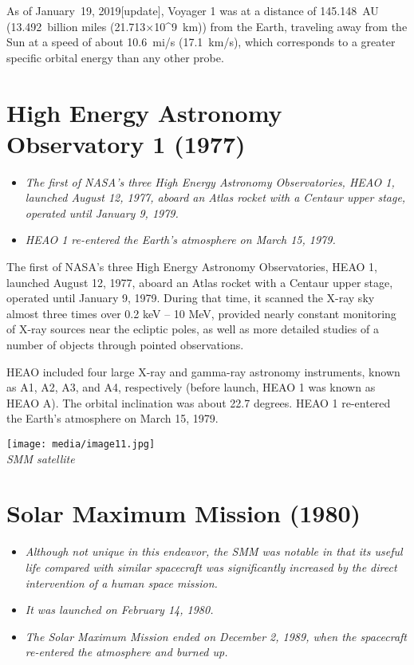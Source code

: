 As of January~19, 2019{[}update{]}, Voyager 1 was at a distance of
145.148~AU (13.492~billion miles (21.713×10\^{}9~km)) from the Earth,
traveling away from the Sun at a speed of about 10.6~mi/s (17.1~km/s),
which corresponds to a greater specific orbital energy than any other
probe.

\section{High Energy Astronomy Observatory 1
(1977)}\label{high-energy-astronomy-observatory-1-1977}

\begin{itemize}
\item
  \emph{The first of NASA's three High Energy Astronomy Observatories,
  HEAO 1, launched August 12, 1977, aboard an Atlas rocket with a
  Centaur upper stage, operated until January 9, 1979.}
\item
  \emph{HEAO 1 re-entered the Earth's atmosphere on March 15, 1979.}
\end{itemize}

The first of NASA's three High Energy Astronomy Observatories, HEAO 1,
launched August 12, 1977, aboard an Atlas rocket with a Centaur upper
stage, operated until January 9, 1979. During that time, it scanned the
X-ray sky almost three times over 0.2 keV -- 10 MeV, provided nearly
constant monitoring of X-ray sources near the ecliptic poles, as well as
more detailed studies of a number of objects through pointed
observations.

HEAO included four large X-ray and gamma-ray astronomy instruments,
known as A1, A2, A3, and A4, respectively (before launch, HEAO 1 was
known as HEAO A). The orbital inclination was about 22.7 degrees. HEAO 1
re-entered the Earth's atmosphere on March 15, 1979.

\texttt{[image: media/image11.jpg]}\\
\emph{SMM satellite}

\section{Solar Maximum Mission (1980)}\label{solar-maximum-mission-1980}

\begin{itemize}
\item
  \emph{Although not unique in this endeavor, the SMM was notable in
  that its useful life compared with similar spacecraft was
  significantly increased by the direct intervention of a human space
  mission.}
\item
  \emph{It was launched on February 14, 1980.}
\item
  \emph{The Solar Maximum Mission ended on December 2, 1989, when the
  spacecraft re-entered the atmosphere and burned up.}
\end{itemize}

